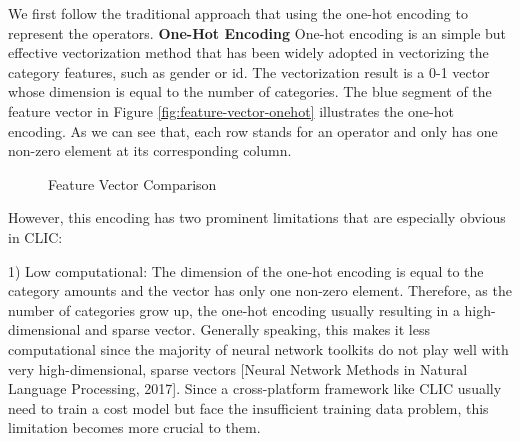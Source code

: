 We first follow the traditional approach that using the one-hot encoding to represent the operators.
\textbf{One-Hot Encoding}
One-hot encoding is an simple but effective vectorization method that has been widely adopted in vectorizing the category features, such as gender or id. 
The vectorization result is a 0-1 vector whose dimension is equal to the number of categories.
The blue segment of the feature vector in Figure \ref{fig:feature-vector-onehot} illustrates the one-hot encoding. 
As we can see that, each row stands for an operator and only has one non-zero element at its corresponding column.

\begin{figure}
  \caption{Feature Vector Comparison}
  \label{fig:feature-vector}
\end{figure}

However, this encoding has two prominent limitations that are especially obvious in CLIC:

1) Low computational: 
The dimension of the one-hot encoding is equal to the category amounts and the vector has only one non-zero element.
Therefore, as the number of categories grow up, the one-hot encoding usually resulting in a high-dimensional and sparse vector. 
Generally speaking, this makes it less computational since the majority of neural network toolkits do not play well with very high-dimensional, sparse vectors [Neural Network Methods in Natural Language Processing, 2017]. 
Since a cross-platform framework like CLIC usually need to train a cost model but face the insufficient training data problem, 
this limitation becomes more crucial to them.

